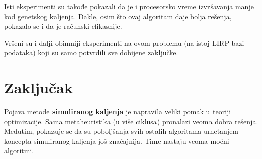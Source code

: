 \documentclass[a4paper]{article}
\begin{document}
Isti eksperimenti su takođe pokazali da je i procesorsko vreme izvršavanja manje kod genetskog kaljenja. Dakle, osim što ovaj algoritam daje bolja rešenja, pokazalo se i da je računski efikasnije. \par Vršeni su i dalji obimniji eksperimenti na ovom problemu \cite{gannealingaplication} (na istoj LIRP bazi podataka) koji su samo potvrdili sve dobijene zaključke.


\section{Zaključak}
\label{sec:zakljucak}

Pojava metode \textbf{simuliranog kaljenja} je napravila veliki pomak u teoriji optimizacije. Sama metaheuristika (u više ciklusa) pronalazi veoma dobra rešenja. Međutim, pokazuje se \cite{gannealingthesis, gannealingaplication} da su poboljšanja svih ostalih algoritama umetanjem koncepta simuliranog kaljenja još značajnija. Time nastaju veoma moćni algoritmi.


\newpage
{}

\appendix



\nocite{*}
\end{document}
